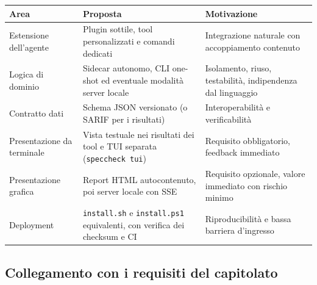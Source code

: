 \documentclass[a4paper, 11pt]{article}
\begin{document}
\vspace{0.3cm}
\noindent
\begin{tabularx}{\textwidth}{|l|X|X|}
    \hline
    \textbf{Area} & \textbf{Proposta} & \textbf{Motivazione} \\ \hline
    Estensione dell'agente & Plugin sottile, tool personalizzati e comandi dedicati & Integrazione naturale con accoppiamento contenuto \\ \hline
    Logica di dominio & Sidecar autonomo, CLI one-shot ed eventuale modalità server locale & Isolamento, riuso, testabilità, indipendenza dal linguaggio \\ \hline
    Contratto dati & Schema JSON versionato (o SARIF per i risultati) & Interoperabilità e verificabilità \\ \hline
    Presentazione da terminale & Vista testuale nei risultati dei tool e TUI separata (\texttt{speccheck tui}) & Requisito obbligatorio, feedback immediato \\ \hline
    Presentazione grafica & Report HTML autocontenuto, poi server locale con SSE & Requisito opzionale, valore immediato con rischio minimo \\ \hline
    Deployment & \texttt{install.sh} e \texttt{install.ps1} equivalenti, con verifica dei checksum e CI & Riproducibilità e bassa barriera d'ingresso \\ \hline
\end{tabularx}
\vspace{0.3cm}

\subsection{Collegamento con i requisiti del capitolato}
\end{document}
